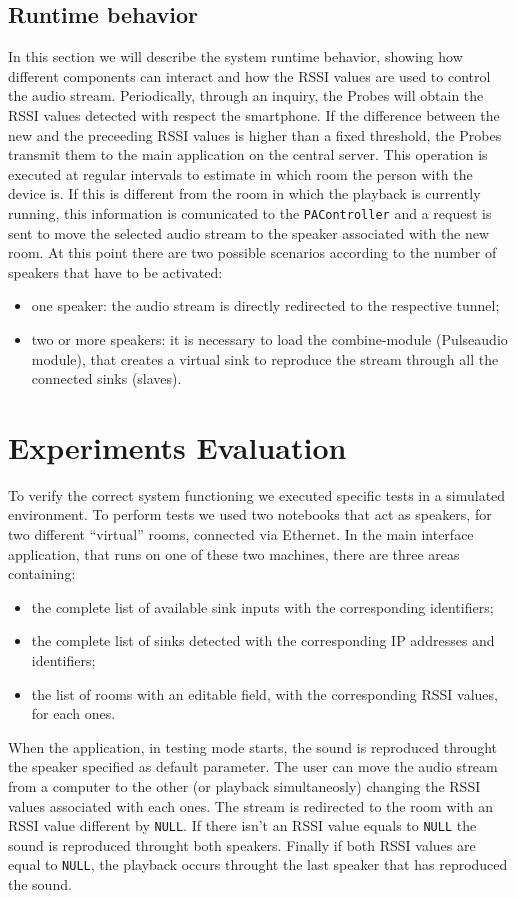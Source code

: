 \documentclass[conference]{IEEEtran}
\begin{document}
\subsection{Runtime behavior}
In this section we will describe the system runtime behavior, showing how different components can interact and how the RSSI values are used to control the audio stream.
Periodically, through an inquiry, the Probes will obtain the RSSI values detected with respect the smartphone. If the difference between the new and the preceeding RSSI values is higher than a fixed threshold, the Probes transmit them to the main application on the central server. This operation is executed at regular intervals to estimate in which room the person with the device is. If this is different from the room in which the playback is currently running, this information is comunicated to the \texttt{PAController} and a request is sent to move the selected audio stream to the speaker associated with the new room. At this point there are two possible scenarios according to the number of speakers that have to be activated:
\begin{itemize}
\item one speaker: the audio stream is directly redirected to the respective tunnel;
\item two or more speakers: it is necessary to load the combine-module (Pulseaudio module), that creates a virtual sink to reproduce the stream through all the connected sinks (slaves).
\end{itemize}

\section{Experiments Evaluation}
To verify the correct system functioning we executed specific tests in a simulated environment. To perform tests we used two notebooks that act as speakers, for two different ``virtual'' rooms, connected via Ethernet. In the main interface application, that runs on one of these two machines, there are three areas containing:
\begin{itemize}
\item the complete list of available sink inputs with the corresponding identifiers; 
\item the complete list of sinks detected with the corresponding IP addresses and identifiers;
\item the list of rooms with an editable field, with the corresponding RSSI values, for each ones.
\end{itemize}
When the application, in testing mode starts, the sound is reproduced throught the speaker specified as default parameter. The user can move the audio stream from a computer to the other (or playback simultaneosly) changing the RSSI values associated with each ones. The stream is redirected to the room with an RSSI value different by \texttt{NULL}. If there isn't an RSSI value equals to \texttt{NULL} the sound is reproduced throught both speakers. Finally if both RSSI values are equal to \texttt{NULL}, the playback occurs throught the last speaker that has reproduced the sound.
\end{document}
